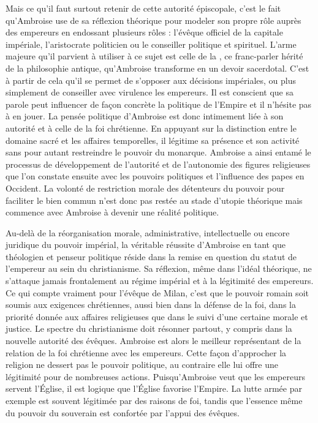 \bigskip

Mais ce qu'il faut surtout retenir de cette autorité épiscopale, c'est le fait qu'Ambroise use de sa réflexion théorique pour modeler son propre rôle auprès des empereurs en endossant plusieurs rôles : l'évêque officiel de la capitale impériale, l'aristocrate politicien ou le conseiller politique et spirituel. L'arme majeure qu'il parvient à utiliser à ce sujet est celle de la , ce franc-parler hérité de la philosophie antique, qu'Ambroise transforme en un devoir sacerdotal. C'est à partir de cela qu'il se permet de s'opposer aux décisions impériales, ou plus simplement de conseiller avec virulence les empereurs. Il est conscient que sa parole peut influencer de façon concrète la politique de l'Empire et il n'hésite pas à en jouer. La pensée politique d'Ambroise est donc intimement liée à son autorité et à celle de la foi chrétienne. En appuyant sur la distinction entre le domaine sacré et les affaires temporelles, il légitime sa présence et son activité sans pour autant restreindre le pouvoir du monarque. Ambroise a ainsi entamé le processus de développement de l'autorité et de l'autonomie des figures religieuses que l'on constate ensuite avec les pouvoirs politiques et l'influence des papes en Occident. La volonté de restriction morale des détenteurs du pouvoir pour faciliter le bien commun n'est donc pas restée au stade d'utopie théorique mais commence avec Ambroise à devenir une réalité politique.

\bigskip

Au-delà de la réorganisation morale, administrative, intellectuelle ou encore juridique du pouvoir impérial, la véritable réussite d'Ambroise en tant que théologien et penseur politique réside dans la remise en question du statut de l'empereur au sein du christianisme. Sa réflexion, même dans l'idéal théorique, ne s'attaque jamais frontalement au régime impérial et à la légitimité des empereurs. Ce qui compte vraiment pour l'évêque de Milan, c'est que le pouvoir romain soit soumis aux exigences chrétiennes, aussi bien dans la défense de la foi, dans la priorité donnée aux affaires religieuses que dans le suivi d'une certaine morale et justice. Le spectre du christianisme doit résonner partout, y compris dans la nouvelle autorité des évêques. Ambroise est alors le meilleur représentant de la relation de la foi chrétienne avec les empereurs. Cette façon d'approcher la religion ne dessert pas le pouvoir politique, au contraire elle lui offre une légitimité pour de nombreuses actions. Puisqu'Ambroise veut que les empereurs servent l'Église, il est logique que l'Église favorise l'Empire. La lutte armée par exemple est souvent légitimée par des raisons de foi, tandis que l'essence même du pouvoir du souverain est confortée par l'appui des évêques.

